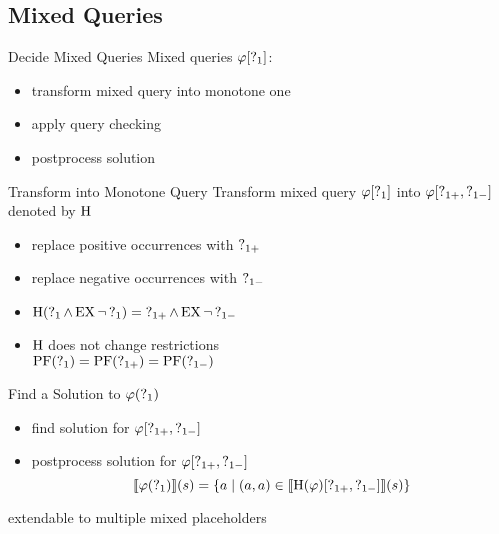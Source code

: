\subsection{Mixed Queries}%

\begin{frame}{Decide Mixed Queries}
  Mixed queries $\varphi[\operatorname{?}_1]$:
  \begin{itemize}
    \item transform mixed query into monotone one
    \item apply query checking
    \item postprocess solution
  \end{itemize}
\end{frame}

\begin{frame}{Transform into Monotone Query}
  Transform mixed query $\varphi[\operatorname{?}_1]$ into $\varphi[\operatorname{?}_{1+},\operatorname{?}_{1-}]$ denoted by $\operatorname{H}$
  \begin{itemize}
    \item replace positive occurrences with $\operatorname{?}_{1+}$
    \item replace negative occurrences with $\operatorname{?}_{1-}$
    \item $\operatorname{H}(\operatorname{?}_1 \land \operatorname{EX} \lnot \operatorname{?}_1) = \operatorname{?}_{1+} \land \operatorname{EX} \lnot \operatorname{?}_{1-}$
    \item $\operatorname{H}$ does not change restrictions \\ 
          $\operatorname{PF}(\operatorname{?}_{1}) = \operatorname{PF}(\operatorname{?}_{1+}) = \operatorname{PF}(\operatorname{?}_{1-})$
  \end{itemize}
\end{frame}

\begin{frame}{Find a Solution to $\varphi(\operatorname{?}_1)$}
  \begin{itemize}
    \item find solution for $\varphi[\operatorname{?}_{1+},\operatorname{?}_{1-}]$
    \item postprocess solution for $\varphi[\operatorname{?}_{1+},\operatorname{?}_{1-}]$
      \[
        \llbracket \varphi(\operatorname{?}_1) \rrbracket (s) = \{ a \mid (a,a) \in 
          \llbracket \operatorname{H} (\varphi)[\operatorname{?}_{1+},\operatorname{?}_{1-}] \rrbracket (s) \}
      \]
  \end{itemize}
  
  extendable to multiple mixed placeholders
\end{frame}
